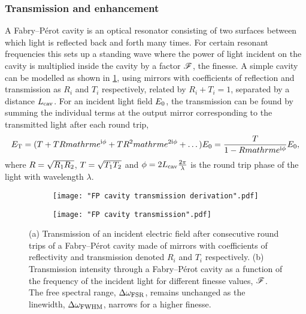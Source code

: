 \documentclass[../Thesis-IJspeert.tex]{subfiles}
\begin{document}
\subsubsection*{Transmission and enhancement}

 A Fabry--P\'{e}rot cavity is an optical resonator consisting of two surfaces between which light is reflected back and forth many times.  For certain resonant frequencies this sets up a standing wave  where the power of light incident on the cavity is multiplied inside the cavity by a factor $\mathscr{F}$, the finesse. A simple cavity can be modelled as shown in \cref{fig:FPcavityTransmissionDerivation}, using mirrors with coefficients of reflection and transmission as $R_{i}$ and $T_{i}$ respectively, related by $R_{i} + T_{i} = 1$, separated by a distance $L_{\mathrm{cav}}$.  For an incident light field $E_{\mathrm{0}}$, the transmission can be found by summing the individual terms at the output mirror corresponding to the transmitted light after each round trip,
\begin{equation}
E_{\mathrm{T}} = (T + T R \\mathrm{e}^{\mathrm{i} \phi} + T R^2 \\mathrm{e}^{2\mathrm{i} \phi} + \dots)E_{\mathrm{0}} = \frac{T}{1-R \\mathrm{e}^{\mathrm{i} \phi}}E_{\mathrm{0}},
\label{eq:FPtransmissionField}
\end{equation} 
where $R = \sqrt{R_{\mathrm{1}}R_{\mathrm{2}}}$, $T = \sqrt{T_{\mathrm{1}}T_{\mathrm{2}}}$ and $\phi = 2L_{\mathrm{cav}} \frac{2\pi}{\lambda}$ is the round trip phase of the light with wavelength $\lambda$.

\begin{figure}[t]
\centering
\begin{subfigure}{0.48\textwidth}
  \centering
  \texttt{[image: "FP cavity transmission derivation".pdf]}
  \caption{\label{fig:FPcavityTransmissionDerivation}}
\end{subfigure}
\begin{subfigure}{0.48\textwidth}
  \centering
   \texttt{[image: "FP cavity transmission".pdf]}
  \caption{\label{fig:FPcavityTransmission}}
\end{subfigure}
\label{fig:FPcavity}
\caption[Transmission of light through a Fabry--P\'{e}rot cavity.]{(a) Transmission of an incident electric field after consecutive round trips of a Fabry--P\'{e}rot cavity made of mirrors with coefficients of reflectivity and transmission denoted $R_{i}$ and $T_{i}$ respectively.  (b) Transmission intensity through a Fabry--P\'{e}rot cavity as a function of the frequency of the incident light for different finesse values, $\mathscr{F}$.  The free spectral range, $\Delta\omega_{\mathrm{FSR}}$, remains unchanged as the linewidth, $\Delta\omega_{\mathrm{FWHM}}$, narrows for a higher finesse.}
\end{figure}
\end{document}
